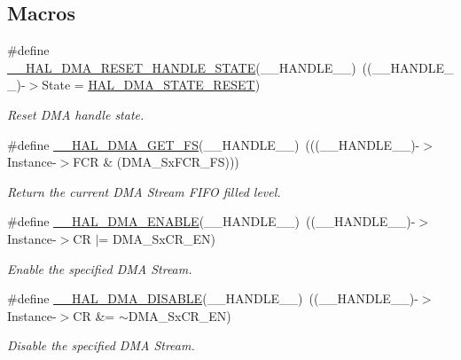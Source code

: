 \subsection*{Macros}
\begin{DoxyCompactItemize}
\item 
\#define \hyperlink{group___d_m_a_gaadcee34f0999c8eafd37de2f69daa0ac}{\+\_\+\+\_\+\+H\+A\+L\+\_\+\+D\+M\+A\+\_\+\+R\+E\+S\+E\+T\+\_\+\+H\+A\+N\+D\+L\+E\+\_\+\+S\+T\+A\+TE}(\+\_\+\+\_\+\+H\+A\+N\+D\+L\+E\+\_\+\+\_\+)~((\+\_\+\+\_\+\+H\+A\+N\+D\+L\+E\+\_\+\+\_\+)-\/$>$State = \hyperlink{group___d_m_a___exported___types_gga9c012af359987a240826f29073bbe463a9e7be73da32b8c837cde0318e0d5eed2}{H\+A\+L\+\_\+\+D\+M\+A\+\_\+\+S\+T\+A\+T\+E\+\_\+\+R\+E\+S\+ET})
\begin{DoxyCompactList}\small\item\em Reset D\+MA handle state. \end{DoxyCompactList}\item 
\#define \hyperlink{group___d_m_a_ga8f0ff408d25904040b9d23ee7f6af080}{\+\_\+\+\_\+\+H\+A\+L\+\_\+\+D\+M\+A\+\_\+\+G\+E\+T\+\_\+\+FS}(\+\_\+\+\_\+\+H\+A\+N\+D\+L\+E\+\_\+\+\_\+)~(((\+\_\+\+\_\+\+H\+A\+N\+D\+L\+E\+\_\+\+\_\+)-\/$>$Instance-\/$>$F\+CR \& (D\+M\+A\+\_\+\+Sx\+F\+C\+R\+\_\+\+FS)))
\begin{DoxyCompactList}\small\item\em Return the current D\+MA Stream F\+I\+FO filled level. \end{DoxyCompactList}\item 
\#define \hyperlink{group___d_m_a_ga93900b3ef3f87ef924eb887279a434b4}{\+\_\+\+\_\+\+H\+A\+L\+\_\+\+D\+M\+A\+\_\+\+E\+N\+A\+B\+LE}(\+\_\+\+\_\+\+H\+A\+N\+D\+L\+E\+\_\+\+\_\+)~((\+\_\+\+\_\+\+H\+A\+N\+D\+L\+E\+\_\+\+\_\+)-\/$>$Instance-\/$>$CR $\vert$=  D\+M\+A\+\_\+\+Sx\+C\+R\+\_\+\+EN)
\begin{DoxyCompactList}\small\item\em Enable the specified D\+MA Stream. \end{DoxyCompactList}\item 
\#define \hyperlink{group___d_m_a_gafeef4c5e8c3f015cdecc0f37bbe063dc}{\+\_\+\+\_\+\+H\+A\+L\+\_\+\+D\+M\+A\+\_\+\+D\+I\+S\+A\+B\+LE}(\+\_\+\+\_\+\+H\+A\+N\+D\+L\+E\+\_\+\+\_\+)~((\+\_\+\+\_\+\+H\+A\+N\+D\+L\+E\+\_\+\+\_\+)-\/$>$Instance-\/$>$CR \&=  $\sim$D\+M\+A\+\_\+\+Sx\+C\+R\+\_\+\+EN)
\begin{DoxyCompactList}\small\item\em Disable the specified D\+MA Stream. \end{DoxyCompactList}\item 

\end{DoxyCompactItemize}
